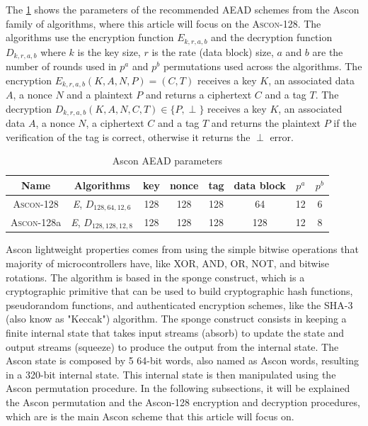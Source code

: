 \documentclass[11pt,twoside]{article}
\begin{document}
The \cref{table:1} shows the parameters of the recommended AEAD schemes from the Ascon family of algorithms, where this article will focus on the \textsc{Ascon-128}. The algorithms use the encryption function $\textit{E}_{k,r,a,b}$ and the decryption function $\textit{D}_{k,r,a,b}$ where $k$ is the key size, $r$ is the rate (data block) size, $a$ and $b$ are the number of rounds used in $p^a$ and $p^b$ permutations used across the algorithms. The encryption $\textit{E}_{k,r,a,b}(K, A, N, P) = (C, T)$ receives a key $K$, an associated data $A$, a nonce $N$ and a plaintext $P$ and returns a ciphertext $C$ and a tag $T$. The decryption $\textit{D}_{k,r,a,b}(K, A, N, C, T) \in \{P, \perp\}$ receives a key $K$, an associated data $A$, a nonce $N$, a ciphertext $C$ and a tag $T$ and returns the plaintext $P$ if the verification of the tag is correct, otherwise it returns the $\perp$ error.


\begin{table}
  \centering
  \begin{tabular}{|c|c|cccc|cc|}
    \hline
    \textbf{Name}       & \textbf{Algorithms}                     & \textbf{key} & \textbf{nonce} & \textbf{tag} & \textbf{data block} & \textbf{$p^a$} & \textbf{$p^b$} \\ \hline
    \textsc{Ascon-128}  & \textit{E}, $\textit{D}_{128,64,12,6}$  & 128          & 128            & 128          & 64                  & 12             & 6              \\ \hline
    \textsc{Ascon-128}a & \textit{E}, $\textit{D}_{128,128,12,8}$ & 128          & 128            & 128          & 128                 & 12             & 8              \\ \hline
  \end{tabular}
  \caption{Ascon AEAD parameters}
  \label{table:1}
\end{table}

Ascon lightweight properties comes from using the simple bitwise operations that majority of microcontrollers have, like XOR, AND, OR, NOT, and bitwise rotations. The algorithm is based in the sponge construct, which is a cryptographic primitive that can be used to build cryptographic hash functions, pseudorandom functions, and authenticated encryption schemes, like the SHA-3 (also know as "Keccak") \cite{bertoni2015keccak} algorithm. The sponge construct consists in keeping a finite internal state that takes input streams (absorb) to update the state and output streams (squeeze) to produce the output from the internal state. The Ascon state is composed by 5 64-bit words, also named as Ascon words, resulting in a 320-bit internal state. This internal state is then manipulated using the Ascon permutation procedure. In the following subsections, it will be explained the Ascon permutation and the Ascon-128 encryption and decryption procedures, which are is the main Ascon scheme that this article will focus on.
\end{document}
